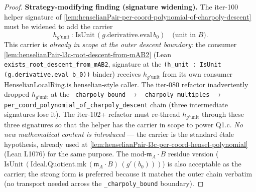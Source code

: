 \begin{proof}
\textbf{Strategy-modifying finding (signature widening).}
The iter-100 helper signature of
\cref{lem:henselianPair-per-coord-polynomial-of-charpoly-descent}
must be widened to add the carrier
\[
h_{g'\mathrm{unit}}\,:\,\mathrm{IsUnit}\,(g.\mathrm{derivative}.\mathrm{eval}\,b_0)
\quad\text{(unit in } B\text{).}
\]
This carrier is \emph{already in scope at the outer descent
boundary}: the consumer
\cref{lem:henselianPair-l3c-root-descent-from-mAB2} (Lean
\texttt{exists\_root\_descent\_from\_mAB2}, signature at the
\texttt{(h\_unit : IsUnit (g.derivative.eval b\_0))} binder)
receives $h_{g'\mathrm{unit}}$ from its own consumer
$\mathrm{HenselianLocalRing}.\mathrm{is\_henselian}$-style
caller. The iter-080 refactor inadvertently dropped
$h_{g'\mathrm{unit}}$ at the
\texttt{\_charpoly\_bound} $\to$ \texttt{\_charpoly\_multiples}
$\to$ \texttt{per\_coord\_polynomial\_of\_charpoly\_descent}
chain (three intermediate signatures lose it). The iter-102+
refactor must re-thread $h_{g'\mathrm{unit}}$ through these
three signatures so that the helper has the carrier in scope to
power Q1.c. \emph{No new mathematical content is introduced} —
the carrier is the standard étale hypothesis, already used at
\cref{lem:henselianPair-l3c-per-coord-hensel-polynomial}
(Lean L1076) for the same purpose. The mod-$\mathfrak m_A \cdot
B$ residue version
($\mathrm{IsUnit}\,(\mathrm{Ideal.Quotient.mk}\,(\mathfrak m_A
\cdot B)\,(g'(b_0)))$) is also acceptable as the carrier; the
strong form is preferred because it matches the outer chain
verbatim (no transport needed across the
\texttt{\_charpoly\_bound} boundary).


\end{proof}
